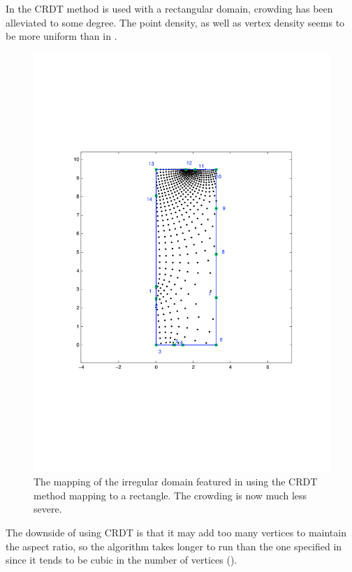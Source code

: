 In  the CRDT method is used with a rectangular domain, crowding has been alleviated to some degree. The point density, as well as vertex density seems to be more uniform than in .

\begin{figure} [tbp]
\centering
\includegraphics[scale=0.5]{sc/figs/irregular-fixed-crdt.pdf}
\caption{The mapping of the irregular domain featured in  using the CRDT method mapping to a rectangle. The crowding is now much less severe.}
\label{uncrowdeddisk}
\end{figure}

The downside of using CRDT is that it may add too many vertices to maintain the aspect ratio, so the algorithm takes longer to run than the one specified in  since it tends to be cubic in the number of vertices (\cite{driscoll05}). 

